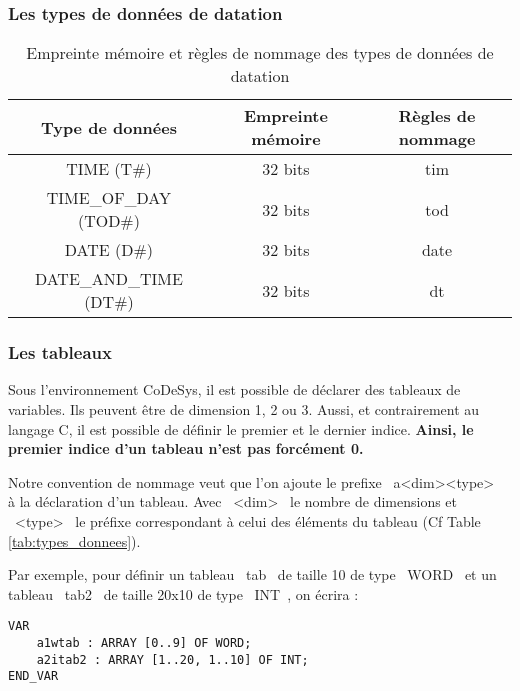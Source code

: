 \subsubsection{Les types de données de datation}
\begin{table}[htbp]
    \centering
    \begin{tabular}{|c|c|c|}
        \hline
        \rowcolor{gray!30} \textbf{Type de données} & \textbf{Empreinte mémoire} & \textbf{Règles de nommage} \\
        \hline
        TIME (T\#) & 32 bits & tim \\
        \hline
        TIME\_OF\_DAY (TOD\#) & 32 bits & tod \\
        \hline
        DATE (D\#) & 32 bits & date \\
        \hline
        DATE\_AND\_TIME (DT\#) & 32 bits & dt \\
        \hline
    \end{tabular}
    \caption{Empreinte mémoire et règles de nommage des types de données de datation}
\end{table}

\subsubsection{Les tableaux}
Sous l'environnement CoDeSys, il est possible de déclarer des tableaux de variables. Ils peuvent être de dimension 1, 2 ou 3. Aussi, et contrairement au langage C, il est possible de définir le premier et le dernier indice. \textbf{Ainsi, le premier indice d'un tableau n'est pas forcément 0.} 


Notre convention de nommage veut que l'on ajoute le prefixe ~a<dim><type>~ à la déclaration d'un tableau. Avec ~<dim>~ le nombre de dimensions et ~<type>~ le préfixe correspondant à celui des éléments du tableau (Cf Table \ref{tab:types_donnees}).

Par exemple, pour définir un tableau ~tab~ de taille 10 de type ~WORD~ et un tableau ~tab2~ de taille 20x10 de type ~INT~, on écrira :
\begin{lstlisting}[language=ST]
VAR 
    a1wtab : ARRAY [0..9] OF WORD;
    a2itab2 : ARRAY [1..20, 1..10] OF INT;
END_VAR
\end{lstlisting}

